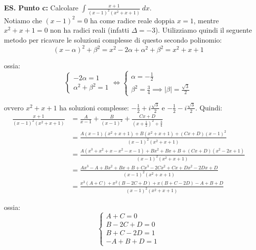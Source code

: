 \documentclass{article}
\begin{document}
\noindent\textbf{ES. Punto c:} Calcolare $\int \frac{x + 1}{(x - 1)^2(x^2 + x + 1)} \ dx$.\\
Notiamo che $(x - 1)^2 = 0$ ha come radice reale doppia $x = 1$, mentre $x^2 + x + 1 = 0$ non ha radici reali (infatti $\Delta = -3$). Utilizziamo quindi il seguente metodo per ricavare le soluzioni complesse di questo secondo polinomio:
\begin{equation*}
    (x - \alpha)^2 + \beta^2 = x^2 - 2\alpha + \alpha^2 + \beta^2 = x^2 + x + 1
\end{equation*}

\noindent ossia:
\begin{equation*}
    \begin{cases}
        -2\alpha = 1 \\
        \alpha^2 + \beta^2 = 1
    \end{cases}
    \iff 
    \begin{cases}
        \alpha = -\frac{1}{2} \\
        \beta^2 = \frac{3}{4} \implies |\beta| = \frac{\sqrt{3}}{2}
    \end{cases}
\end{equation*}

\noindent ovvero $x^ 2 + x + 1$ ha soluzioni complesse: $-\frac{1}{2} + i \frac{\sqrt{3}}{2}$ e $-\frac{1}{2} - i \frac{\sqrt{3}}{2}$. Quindi:
\begin{align*}
    \frac{x + 1}{(x - 1)^2(x^2 + x + 1)} &= \frac{A}{x - 1} + \frac{B}{(x - 1)^2} + \frac{Cx + D}{(x + \frac{1}{2})^2 + \frac{3}{4}} \\ 
    &= \frac{A(x - 1)(x^2 + x + 1) + B(x^2 + x + 1) + (Cx + D)(x - 1)^2}{(x - 1)^2(x^2 + x + 1)} \\
    &= \frac{A(x^3 + x^2 + x - x^2 -x - 1) + Bx^2 + Bx + B + (Cx + D)(x^2 - 2x + 1)}{(x - 1)^2(x^2 + x + 1)} \\
    &= \frac{Ax^3 - A + Bx^2 + Bx + B + Cx^3 - 2Cx^2 + Cx + Dx^2 - 2Dx + D}{(x - 1)^2(x^2 + x + 1)} \\
    &= \frac{x^3(A + C) + x^2(B - 2C + D) + x (B + C - 2D) - A + B + D}{(x - 1)^2(x^2 + x + 1)}
\end{align*}

\noindent ossia:
\begin{equation*}
    \begin{cases}
        A + C = 0 \\
        B - 2C + D = 0 \\
        B + C - 2D = 1 \\
        - A + B + D = 1
    \end{cases}
\end{equation*}
\end{document}
